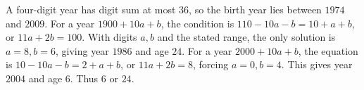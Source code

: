 A four-digit year has digit sum at most $36$, so the birth year lies between $1974$ and $2009$. For a year $1900+10a+b$, the condition is $110-10a-b=10+a+b$, or $11a+2b=100$. With digits $a,b$ and the stated range, the only solution is $a=8,b=6$, giving year $1986$ and age $24$. For a year $2000+10a+b$, the equation is $10-10a-b=2+a+b$, or $11a+2b=8$, forcing $a=0,b=4$. This gives year $2004$ and age $6$. Thus $\boxed{6\text{ or }24}$.
